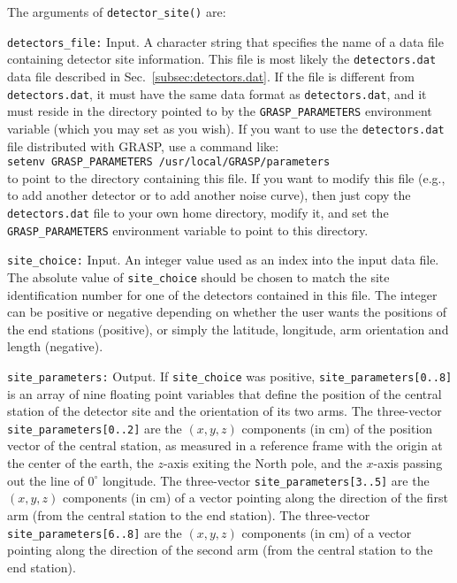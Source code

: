The arguments of {\tt detector\_site()} are:
\begin{description}
%
\item{\tt detectors\_file:} Input.
A character string that specifies the name of a data file
containing detector site information.
This file is most likely the {\tt detectors.dat} data file described
in Sec.~\ref{subsec:detectors.dat}.
If the file is different from {\tt detectors.dat}, it must have the 
same data format as {\tt detectors.dat}, and it must reside in the 
directory pointed to by the {\tt GRASP\_PARAMETERS} environment variable 
(which you may set as you wish).
If you want to use the {\tt detectors.dat} file distributed with
GRASP, use a command like:\\
{\tt setenv GRASP\_PARAMETERS /usr/local/GRASP/parameters}\\
to point to the directory containing this file.  
If you want to modify this file (e.g., to add another detector or 
to add another noise curve), then just copy the {\tt detectors.dat}
file to your own home directory, modify it, and set the 
{\tt GRASP\_PARAMETERS} environment variable to point to this directory. 
%
\item{\tt site\_choice:} Input. 
An integer value used as an index into the input data file.
The absolute value of {\tt site\_choice} should be chosen to match the site 
identification number for one of the detectors contained in this file.
The integer can be positive or negative depending on whether the user
wants the positions of the end stations (positive), or simply the latitude,
longitude, arm orientation and length (negative).
%
\item{\tt site\_parameters:} Output.  If {\tt site\_choice} was positive,
{\tt site\_parameters[0..8]} is an array of nine floating point variables
that define the position of the 
central station of the detector site and the orientation of its two arms.  
The three-vector {\tt site\_parameters[0..2]} are the $(x,y,z)$ components 
(in cm) of the position vector of the central station, as measured in a 
reference frame with the origin at the center of the earth, the 
$z$-axis exiting the North pole, and the $x$-axis passing out the line 
of $0^\circ$ longitude.  
The three-vector {\tt site\_parameters[3..5]} are the $(x,y,z)$ 
components (in cm) of a vector pointing along the direction of the 
first arm (from the central station to the end station).   
The three-vector {\tt site\_parameters[6..8]} are the $(x,y,z)$ 
components (in cm) of a vector pointing along the direction of the 
second arm (from the central station to the end station).

\end{description}
